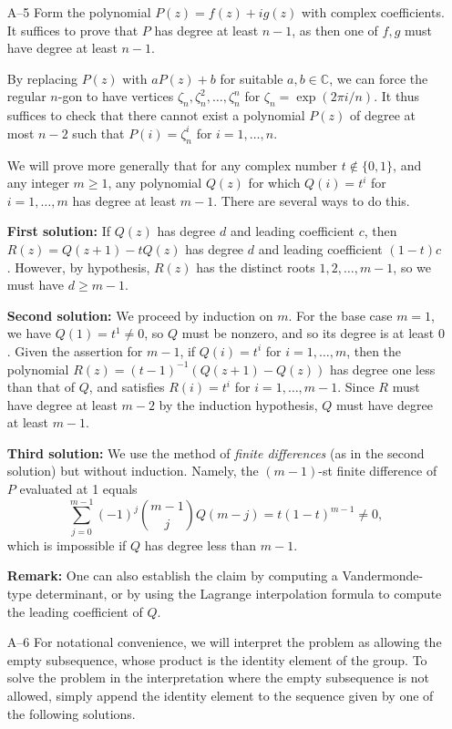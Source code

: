 \documentclass[amssymb,twocolumn,pra,10pt,aps]{revtex4-1}
\newcommand{\CC}{\mathbb{C}}
\begin{document}
\begin{itemize}
\item[A--5]
Form the polynomial $P(z) = f(z) + i g(z)$ with complex coefficients.
It suffices to prove that $P$ has degree at least $n-1$, as then one
of $f, g$ must have degree at least $n-1$.

By replacing $P(z)$ with $a P(z) + b$ for suitable $a,b \in \CC$,
we can force the regular $n$-gon to have vertices
$\zeta_n, \zeta_n^2, \dots, \zeta_n^n$ for
$\zeta_n = \exp(2 \pi i/n)$. It thus suffices to check that
there cannot exist a polynomial $P(z)$ of degree at most $n-2$
such that $P(i) = \zeta_n^i$ for $i=1,\dots,n$.

We will prove more generally that for any complex number
$t \notin \{0,1\}$, and any integer $m \geq 1$,
any polynomial $Q(z)$ for which
$Q(i) = t^i$ for $i=1,\dots,m$ has degree at least $m-1$.
There are several ways to do this.

\textbf{First solution:}
If $Q(z)$ has degree $d$ and leading coefficient $c$,
then $R(z) = Q(z+1) - t Q(z)$ has degree $d$ and leading coefficient $(1-t)c$.
However, by hypothesis, $R(z)$ has the distinct roots
$1,2,\dots,m-1$, so we must have $d \geq m-1$.

\textbf{Second solution:}
We proceed by induction on $m$.
For the base case $m=1$, we have $Q(1) = t^1 \neq 0$,
so $Q$ must be nonzero, and so its degree is at least $0$.
Given the assertion for $m-1$, if $Q(i) = t^i$ for $i=1,\dots,m$,
then the polynomial $R(z) = (t-1)^{-1} (Q(z+1) - Q(z))$ has degree
one less than that of $Q$,
and satisfies $R(i) = t^i$ for $i=1,\dots,m-1$. Since $R$ must have
degree at least $m-2$ by the induction hypothesis, $Q$ must have
degree at least $m-1$.

\textbf{Third solution:}
We use the method of \emph{finite differences} (as in the second
solution) but without induction. Namely,
the $(m-1)$-st finite difference
of $P$ evaluated at 1 equals
\[
\sum_{j=0}^{m-1} (-1)^j \binom{m-1}{j} Q(m-j)
= t(1 - t)^{m-1} \neq 0,
\]
which is impossible if $Q$ has degree less than $m-1$.

\textbf{Remark:} One can also establish the claim by computing
a Vandermonde-type determinant, or by using the Lagrange interpolation
formula to compute the leading coefficient of $Q$.

\item[A--6]
For notational convenience, we will interpret the problem as
allowing the empty subsequence, whose product is the identity element of
the group. To solve the problem in the interpretation where the empty
subsequence is not allowed, simply append the identity element to the sequence
given by one of the following solutions.


\end{itemize}
\end{document}

